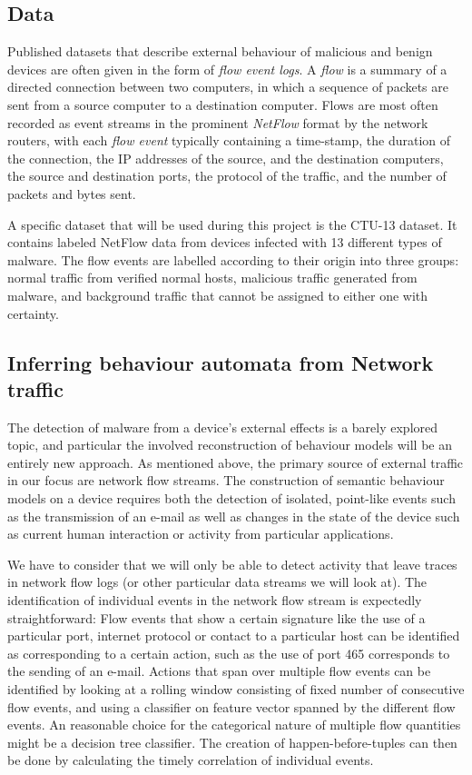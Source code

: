 \documentclass[a4paper,12pt,twoside]{report}
\begin{document}
\subsection{Data}

Published datasets that describe external behaviour of malicious and benign devices are often given in the form of \textit{flow event logs}. A \emph{flow} is a summary of a directed connection between two computers, in which a sequence of packets are sent from a source computer to a destination computer. Flows are most often recorded as event streams in the prominent \emph{NetFlow} format by the network routers, with each \emph{flow event} typically containing a time-stamp, the duration of the connection, the IP addresses of the source, and the destination computers, the source and destination ports, the protocol of the traffic, and the number of packets and bytes sent. 

A specific dataset that will be used during this project is the CTU-13 dataset. It contains labeled NetFlow data from devices infected with 13 different types of malware. The flow events are labelled according to their origin into three groups: normal traffic from verified normal hosts, malicious traffic generated from malware, and background traffic that cannot be assigned to either one with certainty.

\subsection{Inferring behaviour automata from Network traffic}

The detection of malware from a device's external effects is a barely explored topic, and particular the involved reconstruction of behaviour models will be an entirely new approach. As mentioned above, the primary source of external traffic in our focus are network flow streams. The construction of semantic behaviour models on a device requires both the detection of isolated, point-like events such as the transmission of an e-mail as well as changes in the state of the device such as current human interaction or activity from particular applications. 

We have to consider that we will only be able to detect activity that leave traces in network flow logs (or other particular data streams we will look at). 
The identification of individual events in the network flow stream is expectedly straightforward: Flow events that show a certain signature like the use of a particular port, internet protocol or contact to a particular host can be identified as corresponding to a certain action, such as the use of port 465 corresponds to the sending of an e-mail. Actions that span over multiple flow events can be identified by looking at a rolling window consisting of fixed number of consecutive flow events, and using a classifier on feature vector spanned by the different flow events. An reasonable choice for the categorical nature of multiple flow quantities might be a decision tree classifier. The creation of happen-before-tuples can then be done by calculating the timely correlation of individual events.
\end{document}
